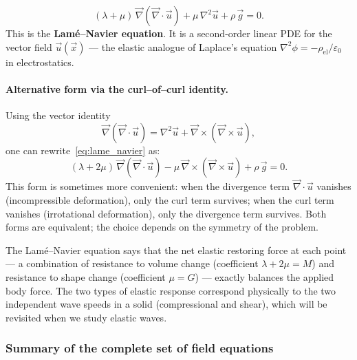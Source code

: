 \begin{equation}
    \boxed{(\lambda + \mu)\,\vec{\nabla}(\vec{\nabla}\cdot\vec{u})
           + \mu\,\nabla^2\vec{u}
           + \rho\,\vec{g} = 0.}
    \label{eq:lame_navier}
\end{equation}
This is the \textbf{Lamé–Navier equation}. It is a second-order linear PDE for the vector field $\vec{u}(\vec{x})$ — the elastic analogue of Laplace's equation $\nabla^2\phi = -\rho_{\mathrm{el}}/\varepsilon_0$ in electrostatics.

\paragraph{Alternative form via the curl–of–curl identity.}
Using the vector identity
\begin{equation}
    \vec{\nabla}(\vec{\nabla}\cdot\vec{u}) = \nabla^2\vec{u} + \vec{\nabla}\times(\vec{\nabla}\times\vec{u}),
    \label{eq:curl_curl_identity}
\end{equation}
one can rewrite~\eqref{eq:lame_navier} as:
\begin{equation}
    (\lambda + 2\mu)\,\vec{\nabla}(\vec{\nabla}\cdot\vec{u})
    - \mu\,\vec{\nabla}\times(\vec{\nabla}\times\vec{u})
    + \rho\,\vec{g} = 0.
    \label{eq:lame_navier_curl}
\end{equation}
This form is sometimes more convenient: when the divergence term $\vec{\nabla}\cdot\vec{u}$ vanishes (incompressible deformation), only the curl term survives; when the curl term vanishes (irrotational deformation), only the divergence term survives. Both forms are equivalent; the choice depends on the symmetry of the problem.

\begin{remark}
    The Lamé–Navier equation says that the net elastic restoring force at each point — a combination of resistance to volume change (coefficient $\lambda+2\mu = M$) and resistance to shape change (coefficient $\mu = G$) — exactly balances the applied body force. The two types of elastic response correspond physically to the two independent wave speeds in a solid (compressional and shear), which will be revisited when we study elastic waves.
\end{remark}

\subsubsection*{Summary of the complete set of field equations}

